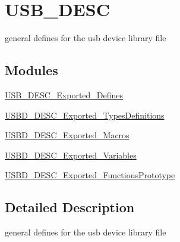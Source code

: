 \hypertarget{group__USB__DESC}{}\section{U\+S\+B\+\_\+\+D\+E\+SC}
\label{group__USB__DESC}


general defines for the usb device library file  


\subsection*{Modules}
\begin{DoxyCompactItemize}
\item 
\hyperlink{group__USB__DESC__Exported__Defines}{U\+S\+B\+\_\+\+D\+E\+S\+C\+\_\+\+Exported\+\_\+\+Defines}
\item 
\hyperlink{group__USBD__DESC__Exported__TypesDefinitions}{U\+S\+B\+D\+\_\+\+D\+E\+S\+C\+\_\+\+Exported\+\_\+\+Types\+Definitions}
\item 
\hyperlink{group__USBD__DESC__Exported__Macros}{U\+S\+B\+D\+\_\+\+D\+E\+S\+C\+\_\+\+Exported\+\_\+\+Macros}
\item 
\hyperlink{group__USBD__DESC__Exported__Variables}{U\+S\+B\+D\+\_\+\+D\+E\+S\+C\+\_\+\+Exported\+\_\+\+Variables}
\item 
\hyperlink{group__USBD__DESC__Exported__FunctionsPrototype}{U\+S\+B\+D\+\_\+\+D\+E\+S\+C\+\_\+\+Exported\+\_\+\+Functions\+Prototype}
\end{DoxyCompactItemize}


\subsection{Detailed Description}
general defines for the usb device library file 


